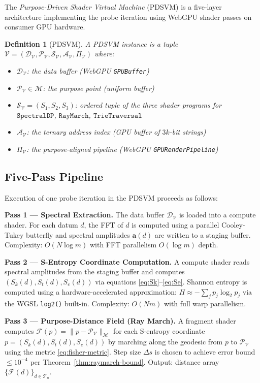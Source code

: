 \documentclass[10pt,twocolumn]{article}
\newtheorem{definition}[theorem]{Definition}
\newcommand{\TruthCell}{\mathcal{T}}
\newcommand{\PurposePoint}{\mathcal{P}}
\newcommand{\DataSpace}{\mathcal{D}}
\newcommand{\ManifoldM}{\mathcal{M}}
\begin{document}
The \emph{Purpose-Driven Shader Virtual Machine} (PDSVM) is a
five-layer architecture implementing the probe iteration
using WebGPU shader passes on consumer GPU hardware.

\begin{definition}[PDSVM]
\label{def:pdsvm}
A PDSVM instance is a tuple
$\mathcal{V} = (\DataSpace_\mathcal{V}, \PurposePoint_\mathcal{V},
\mathcal{S}_\mathcal{V}, \mathcal{A}_\mathcal{V}, \Pi_\mathcal{V})$
where:
\begin{itemize}
\item $\DataSpace_\mathcal{V}$: the data buffer (WebGPU \texttt{GPUBuffer})
\item $\PurposePoint_\mathcal{V} \in \ManifoldM$: the purpose point
      (uniform buffer)
\item $\mathcal{S}_\mathcal{V} = (S_1, S_2, S_3)$: ordered tuple of the three
      shader programs for $\mathtt{SpectralDP}$, $\mathtt{RayMarch}$, $\mathtt{TrieTraversal}$
\item $\mathcal{A}_\mathcal{V}$: the ternary address index (GPU buffer of $3k$-bit strings)
\item $\Pi_\mathcal{V}$: the purpose-aligned pipeline (WebGPU \texttt{GPURenderPipeline})
\end{itemize}
\end{definition}

\subsection{Five-Pass Pipeline}

Execution of one probe iteration in the PDSVM proceeds as follows:

\textbf{Pass 1 --- Spectral Extraction.}
The data buffer $\DataSpace_\mathcal{V}$ is loaded into a compute shader.
For each datum $d$, the FFT of $d$ is computed using a parallel
Cooley-Tukey butterfly \cite{coolidge1965} and spectral amplitudes $\mathbf{a}(d)$
are written to a staging buffer.
Complexity: $O(N \log m)$ with FFT parallelism $O(\log m)$ depth.

\textbf{Pass 2 --- S-Entropy Coordinate Computation.}
A compute shader reads spectral amplitudes from the staging buffer and
computes $(S_k(d), S_t(d), S_e(d))$ via equations \eqref{eq:Sk}--\eqref{eq:Se}.
Shannon entropy is computed using a hardware-accelerated approximation:
$H \approx -\sum_j p_j \log_2 p_j$ via the WGSL \texttt{log2()} built-in.
Complexity: $O(Nm)$ with full warp parallelism.

\textbf{Pass 3 --- Purpose-Distance Field (Ray March).}
A fragment shader computes $\mathcal{F}(p) = \|p - \PurposePoint_\mathcal{V}\|_\ManifoldM$
for each S-entropy coordinate $p = (S_k(d), S_t(d), S_e(d))$ by marching
along the geodesic from $p$ to $\PurposePoint_\mathcal{V}$
using the metric \eqref{eq:fisher-metric}.
Step size $\Delta s$ is chosen to achieve error bound $\leq 10^{-4}$
per Theorem~\ref{thm:raymarch-bound}.
Output: distance array $\{\mathcal{F}(d)\}_{d \in \TruthCell_n}$.
\end{document}
